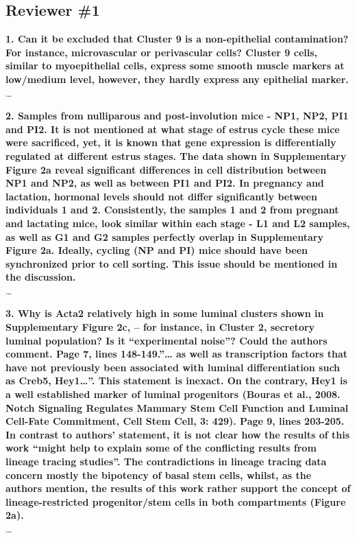 \documentclass{article}
\begin{document}
\subsection*{Reviewer \#1}
\textbf{1. Can it be excluded that Cluster 9 is a non-epithelial contamination? For instance, microvascular or perivascular cells? Cluster 9 cells, similar to myoepithelial cells, express some smooth muscle markers at low/medium level, however, they hardly express any epithelial marker.}\\
\ldots

\textbf{2. Samples from nulliparous and post-involution mice - NP1, NP2, PI1 and PI2. It is not mentioned at what stage of estrus cycle these mice were sacrificed, yet, it is known that gene expression is differentially regulated at different estrus stages. The data shown in Supplementary Figure 2a reveal significant differences in cell distribution between NP1 and NP2, as well as between PI1 and PI2. In pregnancy and lactation, hormonal levels should not differ significantly between individuals 1 and 2. Consistently, the samples 1 and 2 from pregnant and lactating mice, look similar within each stage - L1 and L2 samples, as well as G1 and G2 samples perfectly overlap in Supplementary Figure 2a. Ideally, cycling (NP and PI) mice should have been synchronized prior to cell sorting. This issue should be mentioned in the discussion.}\\
\ldots

\textbf{3. Why is Acta2 relatively high in some luminal clusters shown in Supplementary Figure 2c, – for instance, in Cluster 2, secretory luminal population? Is it “experimental noise”? Could the authors comment.
Page 7, lines 148-149.”… as well as transcription factors that have not previously been associated with luminal differentiation such as Creb5, Hey1…”. This statement is inexact. On the contrary, Hey1 is a well established marker of luminal progenitors (Bouras et al., 2008. Notch Signaling Regulates Mammary Stem Cell Function and Luminal Cell-Fate Commitment, Cell Stem Cell, 3: 429).
Page 9, lines 203-205. In contrast to authors’ statement, it is not clear how the results of this work “might help to explain some of the conflicting results from lineage tracing studies”. The contradictions in lineage tracing data concern mostly the bipotency of basal stem cells, whilst, as the authors mention, the results of this work rather support the concept of lineage-restricted progenitor/stem cells in both compartments (Figure 2a).}\\
\ldots
\end{document}
